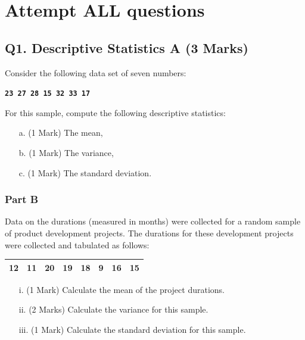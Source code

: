 \documentclass[a4paper,12pt]{article}
\begin{document}
\section*{Attempt ALL questions}
\subsection*{Q1. Descriptive Statistics A (3 Marks)} %
Consider the following data set of seven numbers:

\begin{center}
	\textbf{\texttt{23 27 28 15 32 33 17
			}}
\end{center}

\noindent For this sample, compute the following descriptive statistics:
\begin{itemize}
	\item[a.] (1 Mark) The mean,
	\item[b.] (1 Mark) The variance,
	\item[c.] (1 Mark) The standard deviation.
\end{itemize}

\subsubsection*{Part B} %
Data on the durations (measured in months) were collected for a random sample of product development projects.
The durations for these development projects were collected and tabulated as follows:

\begin{table}[ht]
	\begin{center}
		\begin{tabular}{|rrrrrrrr|}
			
			\hline
			12 & 11 & 20 & 19 & 18 & 9 & 16 & 15 \\
			\hline
		\end{tabular}
	\end{center}
\end{table}

\begin{itemize}
	\item[i.](1 Mark) Calculate the mean of the project durations.
	\item[ii.](2 Marks) Calculate the variance for this sample.
	\item[iii.](1 Mark) Calculate the standard deviation for this sample.
\end{itemize}
\end{document}
